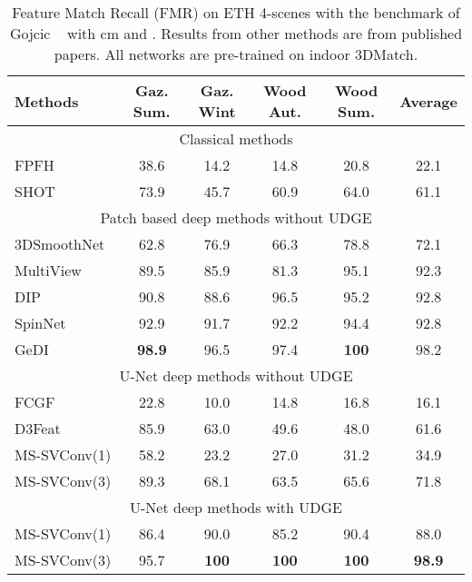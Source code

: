 \documentclass[10pt,twocolumn,letterpaper]{article}
\begin{document}
\begin{table*}[ht]
\small
\centering
\begin{tabular}[t]{lccccc}
\toprule
Methods & Gaz. Sum. & Gaz. Wint & Wood Aut. & Wood Sum. & Average \\
\midrule
\multicolumn{6}{c}{Classical methods} \\
FPFH~\cite{rusu_fast_2009} & 38.6 & 14.2 & 14.8 & 20.8 & 22.1\\
SHOT~\cite{Salti2014SHOTUS} & 73.9 & 45.7 & 60.9 & 64.0 & 61.1\\
\midrule
\multicolumn{6}{c}{Patch based deep methods without UDGE} \\
3DSmoothNet~\cite{gojcic2018perfect} & 62.8 & 76.9 & 66.3 & 78.8 & 72.1\\
MultiView~\cite{Li_2020_CVPR} & 89.5 & 85.9 & 81.3 & 95.1 & 92.3\\
DIP~\cite{Poiesi2021} & 90.8 & 88.6 & 96.5 & 95.2 & 92.8\\
SpinNet~\cite{ao2020SpinNet} & 92.9 & 91.7 & 92.2 & 94.4 & 92.8\\
GeDI~\cite{Poiesi2021gedi} & \bf{98.9} & 96.5 & 97.4 &\bf{100} & 98.2 \\
\midrule
\multicolumn{6}{c}{U-Net deep methods without UDGE} \\
FCGF~\cite{choy2019fully} & 22.8 & 10.0 & 14.8 & 16.8 & 16.1 \\
D3Feat~\cite{bai2020d3feat} & 85.9 & 63.0 & 49.6 & 48.0 & 61.6\\
MS-SVConv(1) & 58.2 & 23.2 & 27.0 & 31.2 & 34.9\\
MS-SVConv(3) & 89.3 & 68.1 & 63.5 & 65.6 & 71.8\\
\midrule
\multicolumn{6}{c}{U-Net deep methods with UDGE} \\
MS-SVConv(1) & 86.4 & 90.0 & 85.2 & 90.4 & 88.0\\
MS-SVConv(3) & 95.7 & \bf{100} & \bf{100} & \bf{100} & \bf{98.9}\\
\bottomrule
\end{tabular}
\caption{Feature Match Recall (FMR) on ETH 4-scenes with the benchmark of Gojcic \etal~\cite{gojcic2018perfect} with  cm and . Results from other methods are from published papers. All networks are pre-trained on indoor 3DMatch.}
\label{tab:ethgojcic}
\end{table*}
\end{document}
